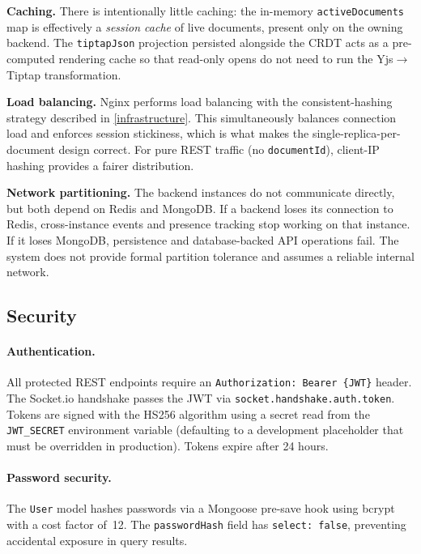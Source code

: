 \documentclass{scrartcl}
\begin{document}
  \textbf{Caching.} There is intentionally little caching: the in-memory \texttt{activeDocuments} map
  is effectively a \emph{session cache} of live documents, present only on the owning backend.
  The \texttt{tiptapJson} projection persisted alongside the CRDT acts as a pre-computed rendering cache
  so that read-only opens do not need to run the Yjs$\rightarrow$Tiptap transformation.

  \textbf{Load balancing.} Nginx performs load balancing with the consistent-hashing strategy described in \cref{infrastructure}.
  This simultaneously balances connection load and enforces session stickiness,
  which is what makes the single-replica-per-document design correct.
  For pure REST traffic (no \texttt{documentId}), client-IP hashing provides a fairer distribution.

  \textbf{Network partitioning.} The backend instances do not communicate directly, but both
  depend on Redis and MongoDB. If a backend loses its connection to Redis, cross-instance
  events and presence tracking stop working on that instance. If it loses MongoDB, persistence
  and database-backed API operations fail. The system does not provide formal partition
  tolerance and assumes a reliable internal network.

  \subsection{Security}\label{security}

  \paragraph{Authentication.}
  All protected REST endpoints require an \texttt{Authorization: Bearer \{JWT\}} header. The
  Socket.io handshake passes the JWT via \texttt{socket.handshake.auth.token}. Tokens are
  signed with the HS256 algorithm using a secret read from the \texttt{JWT\_SECRET} environment
  variable (defaulting to a development placeholder that must be overridden in production).
  Tokens expire after 24 hours.

  \paragraph{Password security.}
  The \texttt{User} model hashes passwords via a Mongoose pre-save hook using bcrypt with a
  cost factor of~12. The \texttt{passwordHash} field has \texttt{select: false}, preventing
  accidental exposure in query results.
\end{document}
